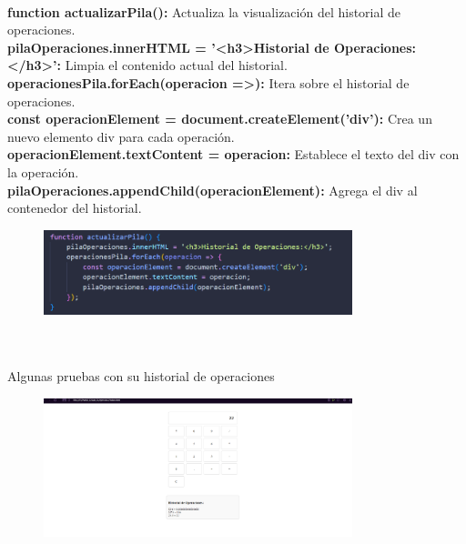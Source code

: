 \documentclass{article}
\begin{document}
\\\textbf{function actualizarPila():} Actualiza la visualización del historial de operaciones.
\\\textbf{pilaOperaciones.innerHTML = '<h3>Historial de Operaciones:</h3>':} Limpia el contenido actual del historial.
\\\textbf{operacionesPila.forEach(operacion =>):} Itera sobre el historial de operaciones.
\\\textbf{const operacionElement = document.createElement('div'):} Crea un nuevo elemento div para cada operación.
\\\textbf{operacionElement.textContent = operacion:} Establece el texto del div con la operación.
\\\textbf{pilaOperaciones.appendChild(operacionElement):} Agrega el div al contenedor del historial.
\begin{figure}[H]
		          \centering
		          \includegraphics[width=0.8\textwidth,keepaspectratio]                       {img/funcionesCal.png}
    \end{figure}  
\\
\\Algunas pruebas con su historial de operaciones
\begin{figure}[H]
		          \centering
		          \includegraphics[width=0.8\textwidth,keepaspectratio]                       {img/pruebaCal1.png}
    \end{figure}  
\\
\end{document}
